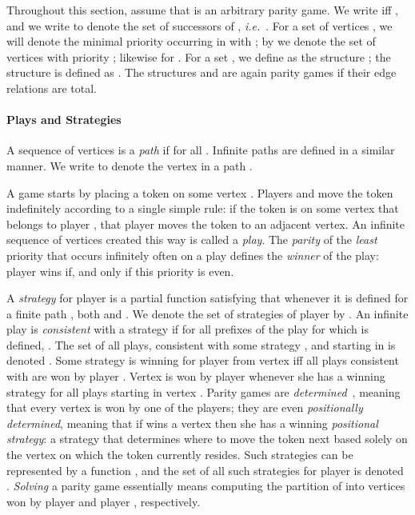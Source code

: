 \documentclass{eptcs}
\newcommand{\ie}{\emph{i.e.}\xspace}
\begin{document}
Throughout this section, assume that  is an arbitrary parity game.  We write  iff
, and we write  to denote the set of successors of
, \ie\ . For a set of vertices , we will denote
the minimal priority occurring in  with ; by 
 we denote the set of vertices with priority ; likewise
for .   For
a set , we define  as the structure ;
the structure  is defined as . The structures  and  are again 
parity games if their edge relations are total. 

\paragraph*{Plays and Strategies}
A sequence of vertices  is a \emph{path} if  for all .  Infinite paths are defined in a similar
manner. We write  to denote the  vertex in a path .

A game starts by placing a token on some vertex .  Players
 and  move the token indefinitely according to a single
simple rule: if the token is on some vertex that belongs to player
, that player moves the token to an adjacent vertex.
An infinite sequence of vertices created this way is called a
\emph{play}.  The \emph{parity} of the \emph{least} priority that occurs
infinitely often on a play defines the \emph{winner} of the play:
player  wins if, and only if this priority is even. 

A \emph{strategy} for player  is a partial function  satisfying that whenever it is defined for a
finite path , both  and
. We denote the set of
strategies of player  by .  
An infinite play  is \emph{consistent} with a strategy  if
for all prefixes  of the play for which  is defined, . The
set of all plays, consistent with some strategy , and starting
in  is denoted . Some
strategy  is winning for player  from vertex  iff
all plays consistent with  are won by player .  Vertex
 is won by player  whenever she has a winning strategy for
all plays starting in vertex .  Parity games are
\emph{determined}~\cite{EJ:91}, meaning that every vertex is won
by one of the players; they are even \emph{positionally determined},
meaning that if  wins a vertex then she has a winning
\emph{positional strategy}: a strategy that determines where to
move the token next based solely on the vertex on which the token
currently resides. Such strategies can be represented by a function
, and the set of all such strategies for
player  is denoted .  \emph{Solving} a parity game 
essentially means computing the partition 
of  into vertices won by player  and player ,
respectively.
\end{document}
